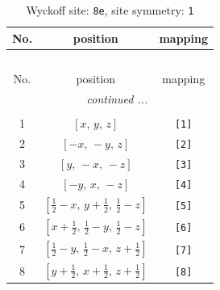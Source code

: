 \documentclass[fleqn,8pt]{jsarticle}
\begin{document}
\renewcommand{\arraystretch}{1.2}
\begin{longtable}{ccc}
\caption{Wyckoff site: {\tt 8e}, site symmetry: {\tt 1}}
 \\
 \hline \hline
No. & position & mapping \\ \hline \endfirsthead

\multicolumn{2}{l}{\tablename\ \thetable{}} \\
 \hline \hline
No. & position & mapping \\ \hline \endhead

 \hline \hline
\multicolumn{2}{r}{\footnotesize\it continued ...} \\ \endfoot

 \hline \hline
\multicolumn{2}{r}{} \\ \endlastfoot

1 & $\left[ x,\, y,\, z \right]$ & {\tt [1]} \\ \hline
2 & $\left[ - x,\, - y,\, z \right]$ & {\tt [2]} \\ \hline
3 & $\left[ y,\, - x,\, - z \right]$ & {\tt [3]} \\ \hline
4 & $\left[ - y,\, x,\, - z \right]$ & {\tt [4]} \\ \hline
5 & $\left[ \frac{1}{2} - x,\, y + \frac{1}{2},\, \frac{1}{2} - z \right]$ & {\tt [5]} \\ \hline
6 & $\left[ x + \frac{1}{2},\, \frac{1}{2} - y,\, \frac{1}{2} - z \right]$ & {\tt [6]} \\ \hline
7 & $\left[ \frac{1}{2} - y,\, \frac{1}{2} - x,\, z + \frac{1}{2} \right]$ & {\tt [7]} \\ \hline
8 & $\left[ y + \frac{1}{2},\, x + \frac{1}{2},\, z + \frac{1}{2} \right]$ & {\tt [8]} \\
\end{longtable}
\end{document}
